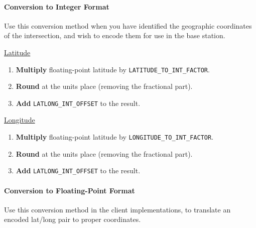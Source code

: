 \documentclass[12pt, oneside]{article}
\begin{document}

\paragraph{Conversion to Integer Format} Use this conversion method when you have identified the geographic coordinates of the intersection, and wish to encode them for use in the base station.

\begin{minipage}{0.5\textwidth}
\begin{center} \underline{Latitude}\end{center}
\begin{enumerate}
\item \textbf{Multiply} floating-point latitude by \texttt{LATITUDE_TO_INT_FACTOR}. 
\item \textbf{Round} at the units place (removing the fractional part). 
\item \textbf{Add} \texttt{LATLONG_INT_OFFSET} to the result.
\end{enumerate}
\end{minipage}%
\begin{minipage}{0.5\textwidth}
\begin{center} \underline{Longitude}\end{center}
\begin{enumerate}
\item \textbf{Multiply} floating-point latitude by \texttt{LONGITUDE_TO_INT_FACTOR}. 
\item \textbf{Round} at the units place (removing the fractional part). 
\item \textbf{Add} \texttt{LATLONG_INT_OFFSET} to the result.
\end{enumerate}
\end{minipage}


\paragraph{Conversion to Floating-Point Format} Use this conversion method in the client implementations, to translate an encoded lat/long pair to proper coordinates.
\end{document}
